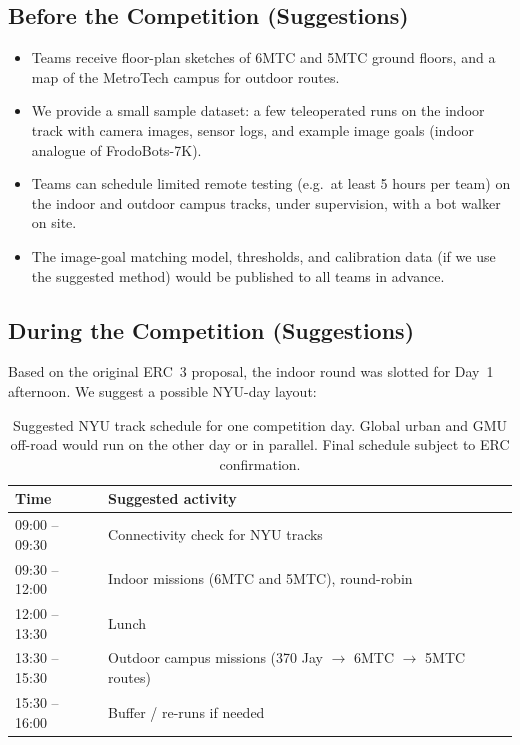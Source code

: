 \documentclass[11pt,a4paper]{article}
\begin{document}
\subsection{Before the Competition (Suggestions)}

\begin{itemize}
    \item Teams receive floor-plan sketches of 6MTC and 5MTC ground floors, and a map of the MetroTech campus for outdoor routes.
    \item We provide a small sample dataset: a few teleoperated runs on the indoor track with camera images, sensor logs, and example image goals (indoor analogue of FrodoBots-7K).
    \item Teams can schedule limited remote testing (e.g.\ at least 5 hours per team) on the indoor and outdoor campus tracks, under supervision, with a bot walker on site.
    \item The image-goal matching model, thresholds, and calibration data (if we use the suggested method) would be published to all teams in advance.
\end{itemize}

\subsection{During the Competition (Suggestions)}

Based on the original ERC~3 proposal, the indoor round was slotted for Day~1 afternoon. We suggest a possible NYU-day layout:

\begin{table}[h]
\centering
\begin{tabular}{ll}
\toprule
\textbf{Time} & \textbf{Suggested activity} \\
\midrule
09:00 -- 09:30 & Connectivity check for NYU tracks \\
09:30 -- 12:00 & Indoor missions (6MTC and 5MTC), round-robin \\
12:00 -- 13:30 & Lunch \\
13:30 -- 15:30 & Outdoor campus missions (370 Jay $\to$ 6MTC $\to$ 5MTC routes) \\
15:30 -- 16:00 & Buffer / re-runs if needed \\
\bottomrule
\end{tabular}
\caption{Suggested NYU track schedule for one competition day. Global urban and GMU off-road would run on the other day or in parallel. Final schedule subject to ERC confirmation.}
\end{table}
\end{document}
